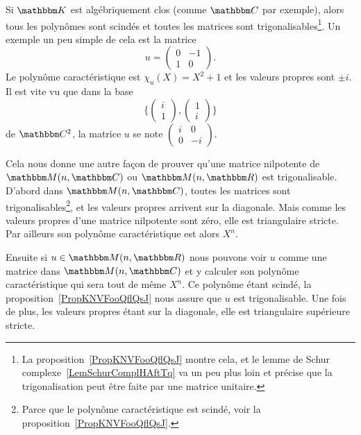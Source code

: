 \begin{remark}  \label{RemXFZTooXkGzQg}
    Si \( \eK\) est algébriquement clos (comme \( \eC\) par exemple), alors tous les polynômes sont scindés et toutes les matrices sont trigonalisables\footnote{La proposition~\ref{PropKNVFooQflQsJ} montre cela, et le lemme de Schur complexe~\ref{LemSchurComplHAftTq} va un peu plus loin et précise que la trigonalisation peut être faite par une matrice unitaire.}. Un exemple un peu simple de cela est la matrice
    \begin{equation}
        u=\begin{pmatrix}
            0    &   -1    \\
            1    &   0
        \end{pmatrix}.
    \end{equation}
    Le polynôme caractéristique est \( \chi_u(X)=X^2+1\) et les valeurs propres sont \( \pm i\). Il est vite vu que dans la base
    \begin{equation}
        \{ \begin{pmatrix}
        i    \\
    1
\end{pmatrix}, \begin{pmatrix}
1    \\
i
\end{pmatrix}\}
    \end{equation}
    de \( \eC^2\), la matrice \( u\) se note \( \begin{pmatrix}
        i    &   0    \\
        0    &   -i
    \end{pmatrix}\).
\end{remark}

\begin{remark}  \label{RemREOSooGEDJWX}
    Cela nous donne une autre façon de prouver qu'une matrice nilpotente de \( \eM(n,\eC)\) ou \( \eM(n,\eR)\) est trigonalisable\cite{KDUFooVxwqlC}. D'abord dans \( \eM(n,\eC)\), toutes les matrices sont trigonalisables\footnote{Parce que le polynôme caractéristique est scindé, voir la proposition~\ref{PropKNVFooQflQsJ}.}, et les valeurs propres arrivent sur la diagonale. Mais comme les valeurs propres d'une matrice nilpotente sont zéro, elle est triangulaire stricte. Par ailleurs son polynôme caractéristique est alors \( X^n\).

    Ensuite si \( u\in \eM(n,\eR)\) nous pouvons voir \( u\) comme une matrice dans \( \eM(n,\eC)\) et y calculer son polynôme caractéristique qui sera tout de même \( X^n\). Ce polynôme étant scindé, la proposition~\ref{PropKNVFooQflQsJ} nous assure que \( u\) est trigonalisable. Une fois de plus, les valeurs propres étant sur la diagonale, elle est triangulaire supérieure stricte.
\end{remark}


